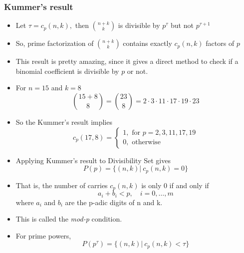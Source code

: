 \documentclass{beamer}
\begin{document}
\begin{frame}
    \frametitle{Kummer's result}
    \begin{itemize}
        \item Let $\tau = c_p(n,k),$ then $\binom{n+k}{k}$ is divisible by $p^\tau$ but not $p^{\tau + 1}$
        \item So, prime factorization of $\binom{n+k}{k}$ contains exactly $c_p(n,k)$ factors of $p$
        \item This result is pretty amazing, since it gives a direct method to check if a binomial coefficient is divisible by $p$ or not.
        \item For $n=15$ and $k=8$
        \begin{equation*}
            \binom{15+8}{8} = \binom{23}{8} = 2 \cdot 3 \cdot 11 \cdot 17 \cdot 19 \cdot 23
        \end{equation*} 
        \item So the Kummer's result implies 
        \begin{equation*}
            c_{p}(17,8)=\left\{\begin{array}{l}{1, \text { for } p=2,3,11,17,19} \\  {0, \text { otherwise }}\end{array}\right.
        \end{equation*}
    \end{itemize}
\end{frame}

\begin{frame}
    \begin{itemize}
        \item Applying Kummer's result to Divisibility Set gives 
        \begin{equation*}
            P(p) = \{(n,k) | \ c_p(n,k) = 0\}
        \end{equation*}
        \item That is, the number of carries $c_p(n,k)$ is only $0$ if and only if 
        \begin{equation*}
            a_i + b_i < p, \quad i = 0,\dots,m
        \end{equation*}
        where $a_i$ and $b_i$ are the p-adic digits of n and k. 
        \item This is called the \textit{mod-p} condition.
        \item For prime powers, 
        \begin{equation*}
            P(p^\tau) = \{(n,k)| \ c_p(n,k) < \tau \}
        \end{equation*}
    \end{itemize}
\end{frame}
\end{document}
